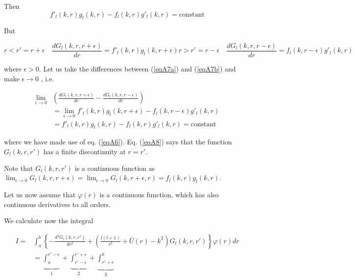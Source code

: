 Then
 \begin{equation}\label{eqA6}
f'_l(k,r)g_l(k,r)-f_l(k,r)g'_l(k,r)=\text{constant}
\end{equation}

But

\begin{subequations}
 \begin{equation}\label{eqA7a}
r<r'=r+\epsilon \quad \frac{dG_l(k,r,r+\epsilon)}{dr}=f'_l(k,r)g_l(k,r+\epsilon)
\end{equation}



\begin{equation}\label{eqA7b}
r>r'=r-\epsilon \quad \frac{dG_l(k,r,r-\epsilon)}{dr}=f_l(k,r-\epsilon)g'_l(k,r)
\end{equation}
\end{subequations}

where $\epsilon>0$. Let us take the differences between (\ref{eqA7a}) and (\ref{eqA7b}) and make $\epsilon \rightarrow 0$ , i.e.


\begin{equation}\label{eqA8}
\begin{split}
\lim_{\epsilon \rightarrow 0}& \left( \frac{dG_l(k,r,r+\epsilon)}{dr}-\frac{dG_l(k,r,r-\epsilon)}{dr}\right) \\
& =\lim_{\epsilon \rightarrow 0} f'_l(k,r)g_l(k,r+\epsilon)-f_l(k,r-\epsilon)g'_l(k,r)\\
&=f'_l(k,r)g_l(k,r)-f_l(k,r)g'_l(k,r)=\text{constant}
\end{split}
\end{equation}

where we have made use of eq. (\ref{eqA6}). Eq. (\ref{eqA8}) says that the function $G_l(k,r,r')$ has a finite discontinuity at $r=r'$.

Note that $G_l(k,r,r')$ is a continuous function as $\lim_{\epsilon \rightarrow 0} G_l(k,r,r+\epsilon)=\lim_{\epsilon \rightarrow 0} G_l(k,r+\epsilon,r)=f_l(k,r)g_l(k,r)$.


Let us now assume that $\varphi(r)$ is a continuous function, which has also continuous derivatives to all orders.

We calculate now the integral

\begin{equation}\label{eqA10}
\begin{split}
I=& \int_a^b\left\lbrace -\frac{d^2G_l(k,r,r')}{dr^2}+\left( \frac{l(l+1)}{r^2}+\bar U(r)-k^2\right) G_l(k,r,r')\right\rbrace \varphi(r) dr\\
&=\underbrace{\int_a^{r'-\epsilon}}_{1}+\underbrace{\int_{r'-\epsilon}^{r'+\epsilon}}_{2}+
\underbrace{\int_{r'+\epsilon}^b}_{\text{3}}
\end{split}
\end{equation}


